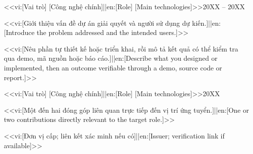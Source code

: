 \documentclass[a4paper,11pt]{article}
\begin{document}
  {<<vi:[Vai trò] \textbar{} [Công nghệ chính]||en:[Role] \textbar{} [Main technologies]>>}{20XX -- 20XX}
\begin{cvitems}
  \item {}<<vi:[Giới thiệu vấn đề dự án giải quyết và người sử dụng dự kiến.]||en:[Introduce the problem addressed and the intended users.]>>
  \item {}<<vi:[Nêu phần tự thiết kế hoặc triển khai, rồi mô tả kết quả có thể kiểm tra qua demo, mã nguồn hoặc báo cáo.]||en:[Describe what you designed or implemented, then an outcome verifiable through a demo, source code or report.]>>
\end{cvitems}
  {<<vi:[Vai trò] \textbar{} [Công nghệ chính]||en:[Role] \textbar{} [Main technologies]>>}{20XX}
\begin{cvitems}
  \item {}<<vi:[Một đến hai đóng góp liên quan trực tiếp đến vị trí ứng tuyển.]||en:[One or two contributions directly relevant to the target role.]>>
\end{cvitems}


        {<<vi:[Đơn vị cấp; liên kết xác minh nếu có]||en:[Issuer; verification link if available]>>}{}
\end{document}
